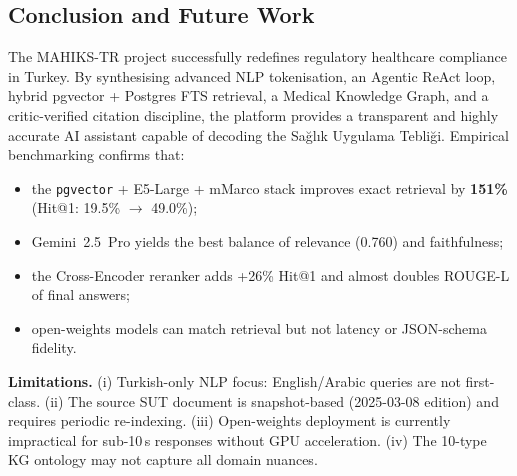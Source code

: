 \documentclass[11pt, a4paper]{article}
\begin{document}
\begin{itemize}[leftmargin=*]
\section{Conclusion and Future Work}

The MAHIKS-TR project successfully redefines regulatory healthcare compliance in Turkey. By synthesising advanced NLP tokenisation, an Agentic ReAct loop, hybrid pgvector + Postgres FTS retrieval, a Medical Knowledge Graph, and a critic-verified citation discipline, the platform provides a transparent and highly accurate AI assistant capable of decoding the Sağlık Uygulama Tebliği. Empirical benchmarking confirms that:

\begin{itemize}[leftmargin=*]
    \item the \texttt{pgvector} + E5-Large + mMarco stack improves exact retrieval by \textbf{151\%} (Hit@1: 19.5\% $\to$ 49.0\%);
    \item Gemini~2.5~Pro yields the best balance of relevance (0.760) and faithfulness;
    \item the Cross-Encoder reranker adds +26\% Hit@1 and almost doubles ROUGE-L of final answers;
    \item open-weights models can match retrieval but not latency or JSON-schema fidelity.
\end{itemize}

\textbf{Limitations.} (i) Turkish-only NLP focus: English/Arabic queries are not first-class. (ii) The source SUT document is snapshot-based (2025-03-08 edition) and requires periodic re-indexing. (iii) Open-weights deployment is currently impractical for sub-10\,s responses without GPU acceleration. (iv) The 10-type KG ontology may not capture all domain nuances.


\end{itemize}
\end{document}
